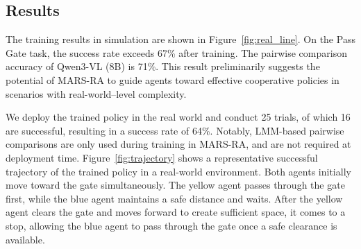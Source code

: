 \documentclass[11pt]{article}
\begin{document}
\subsection{Results}
The training results in simulation are shown in Figure~\ref{fig:real_line}. On the Pass Gate task, the success rate exceeds 67\% after training. The pairwise comparison accuracy of Qwen3-VL (8B) is 71\%. This result preliminarily suggests the potential of MARS-RA to guide agents toward effective cooperative policies in scenarios with real-world–level complexity. 

We deploy the trained policy in the real world and conduct 25 trials, of which 16 are successful, resulting in a success rate of 64\%. Notably, LMM-based pairwise comparisons are only used during training in MARS-RA, and are not required at deployment time. Figure~\ref{fig:trajectory} shows a representative successful trajectory of the trained policy in a real-world environment. Both agents initially move toward the gate simultaneously. The yellow agent passes through the gate first, while the blue agent maintains a safe distance and waits. After the yellow agent clears the gate and moves forward to create sufficient space, it comes to a stop, allowing the blue agent to pass through the gate once a safe clearance is available.
\end{document}
